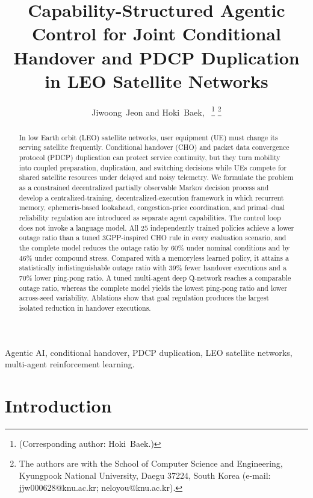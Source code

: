 \documentclass[journal]{IEEEtran}
\begin{document}
\title{Capability-Structured Agentic Control for Joint Conditional Handover
and PDCP Duplication in LEO Satellite Networks}
\author{Jiwoong~Jeon and Hoki~Baek,~%
\thanks{(Corresponding author: Hoki~Baek.)}%
\thanks{The authors are with the School of Computer Science and Engineering,
Kyungpook National University, Daegu 37224, South Korea (e-mail:
jjw000628@knu.ac.kr; neloyou@knu.ac.kr).}}
\maketitle

\begin{abstract}
In low Earth orbit (LEO) satellite networks, user equipment (UE) must change
its serving satellite frequently. Conditional handover (CHO) and packet data
convergence protocol (PDCP) duplication can protect service continuity, but
they turn mobility into coupled preparation, duplication, and switching
decisions while UEs compete for shared satellite resources under delayed and
noisy telemetry. We formulate the problem as a constrained decentralized
partially observable Markov decision process and develop a centralized-training,
decentralized-execution framework in which recurrent memory, ephemeris-based
lookahead, congestion-price coordination, and primal--dual reliability
regulation are introduced as separate agent capabilities. The control loop does not invoke a language model. All $25$ independently trained
policies achieve a lower outage ratio than a tuned 3GPP-inspired CHO rule in
every evaluation scenario, and the complete model reduces the outage ratio by
$60\%$ under nominal conditions and by $46\%$ under compound stress. Compared
with a memoryless learned policy, it attains a statistically indistinguishable outage ratio with $39\%$ fewer handover executions and a $70\%$ lower ping-pong
ratio. A tuned multi-agent deep Q-network reaches a comparable outage ratio,
whereas the complete model yields the lowest ping-pong ratio and lower across-seed variability. Ablations show that goal regulation produces the largest isolated reduction in handover executions.
\end{abstract}

\begin{IEEEkeywords}
Agentic AI, conditional handover, PDCP duplication, LEO satellite
networks, multi-agent reinforcement learning.
\end{IEEEkeywords}

\section{Introduction}
\label{sec:introduction}
\end{document}
